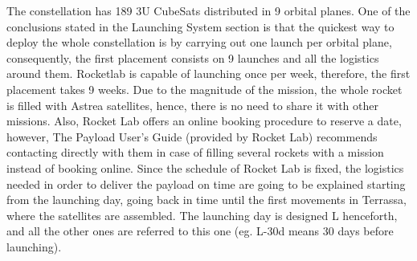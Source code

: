 The constellation has 189 3U CubeSats distributed in 9 orbital planes. One of the conclusions stated in the Launching System section  is that the quickest way to deploy the whole constellation is by carrying out one launch per orbital plane, consequently, the first placement consists on 9 launches and all the logistics around them. Rocketlab is capable of launching once per week, therefore, the first placement takes 9 weeks. Due to the magnitude of the mission, the whole rocket is filled with Astrea satellites, hence, there is no need to share it with other missions. Also, Rocket Lab offers an online booking procedure to reserve a date, however, The Payload User's Guide (provided by Rocket Lab) recommends contacting directly with them in case of filling several rockets with a mission instead of booking online.  
\newline\newline
Since the schedule of Rocket Lab is fixed, the logistics needed in order to deliver the payload on time are going to be explained starting from the launching day, going back in time until the first movements in Terrassa, where the satellites are assembled. 
The launching day is designed L henceforth, and all the other ones are referred to this one (eg. L-30d means 30 days before launching). 


